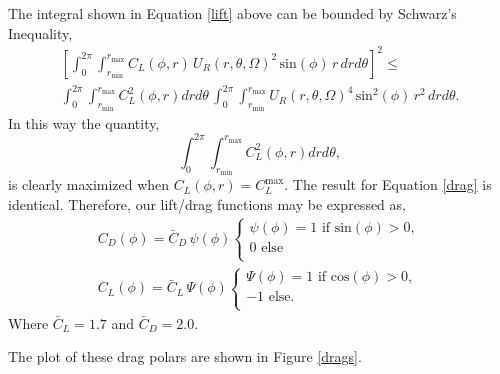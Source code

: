 %
%
The integral shown in Equation \ref{lift} above can be bounded by 
Schwarz's Inequality,  
\begin{align*}
  \left[
    \int_0^{2\pi}
    \int_{r_{\text{min}}}^{r_{\text{max}}} C_L(\phi,r)\, U_R(r,\theta,\Omega)^2
 \,\text{sin}(\phi)\, r\,dr d\theta \right]^2 \le \\
  \int_0^{2\pi} \int_{r_{\text{min}}}^{r_{\text{max}}} C_L^2(\phi,r) dr d\theta\,
  \int_0^{2\pi} \int_{r_{\text{min}}}^{r_{\text{max}}} U_R(r,\theta,\Omega)^4 
 \,\text{sin}^2(\phi)\, r^2\,dr d\theta.
\end{align*}
In this way the quantity,
\begin{equation}
  \int_0^{2\pi}
 \int_{r_{\text{min}}}^{r_{\text{max}}} C_L^2(\phi,r) dr d\theta, 
\end{equation}
is clearly maximized when $C_L(\phi,r) = C_L^{\text{max}}$. 
The result for Equation \ref{drag} is identical. 
Therefore, our lift/drag functions may be expressed as,
\begin{align*} 
 C_D(\phi) = \bar C_D \, \psi(\phi) 
  \begin{cases}
   \psi(\phi) = 1 \text{ if sin}(\phi) > 0,   \\
   0 \text{ else} \\
  \end{cases} \\
 C_L(\phi) = \bar C_L \, \Psi(\phi) 
  \begin{cases}
   \Psi(\phi) = 1 \text{ if cos}(\phi) > 0,   \\
   -1 \text{ else}. \\
  \end{cases}
\end{align*}
Where $\bar C_L = 1.7$ and $\bar C_D = 2.0$.

The plot of these drag polars are shown in Figure \ref{drags}. 

